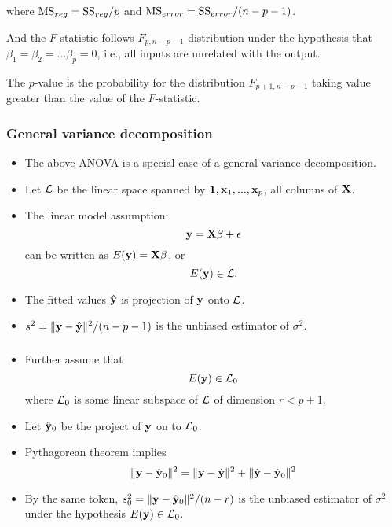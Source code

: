 \documentclass{beamer}
\begin{document}
      
      
      
      \begin{frame}
      	\frametitle{ }
      	where $\hbox{MS}_{reg} = \hbox{SS}_{reg}/ p$ and $\hbox{MS}_{error}= \hbox{SS}_{error}/(n-p-1)$.
      	
      	And the $F$-statistic follows $F_{p, n-p-1}$ distribution under the hypothesis that
      	$\beta_1=\beta_2=...\beta_p=0$, i.e., all inputs are unrelated with the output.
      	
      	
      	The $p$-value is the probability for the distribution $F_{p+1, n-p-1}$ taking value
      	greater than the value of the $F$-statistic.
      	
      \end{frame}
      
      
      \begin{frame}
      	\frametitle{General variance decomposition}
      	\begin{itemize}
      		\item
      		The above ANOVA is a special case of a general  variance decomposition.
      		\item
      		Let ${\cal L}$ be the linear space spanned by ${\bf 1}, {\bf x}_1, ..., {\bf x}_p$, all
      		columns of $\bf X$. 
      		\item The linear model assumption:
      		$${\bf y} = {\bf X}{\bf \beta} + {\bf \epsilon}$$
      		can be written as $E({\bf y}) = {\bf X}{\bf \beta} $, or
      		$$ E({\bf y}) \in {\cal L}.$$
      		\item 
      		The fitted values $\hat {\bf y}$ is projection of $\bf y$ onto ${\cal L}$.
      		\item 
      		$s^2 = \|{\bf y} - \hat {\bf y}\|^2/(n-p-1)$ is the unbiased estimator of $\sigma^2$.
      		
      		
      	\end{itemize}
      \end{frame}
      
      
      
      \begin{frame}
      	\frametitle{ }
      	\begin{itemize}
      		\item 
      		Further assume that
      		$$ E({\bf y}) \in {\cal L}_0$$
      		where ${\cal L}_0$ is some linear subspace of ${\cal L}$ of dimension $r < p+1$.
      		
      		\item 
      		Let $\hat {\bf y}_0$ be the project of $\bf y$ on to ${\cal L}_0$.
      		
      		\item
      		Pythagorean theorem implies
      		$$ \|{\bf y} - \hat {\bf y}_0\|^2 = \|{\bf y} - \hat {\bf y} \|^2 +\|\hat {\bf y} - \hat {\bf y}_0\|^2 $$
      		\item By the same token,
      		$s^2_0 = \|{\bf y} - \hat {\bf y}_0 \|^2/(n-r)$ is
      		the unbiased estimator of $\sigma^2$ under the hypothesis $ E({\bf y}) \in {\cal L}_0$.
      		
      		
      	\end{itemize}
      \end{frame}
      
\end{document}
